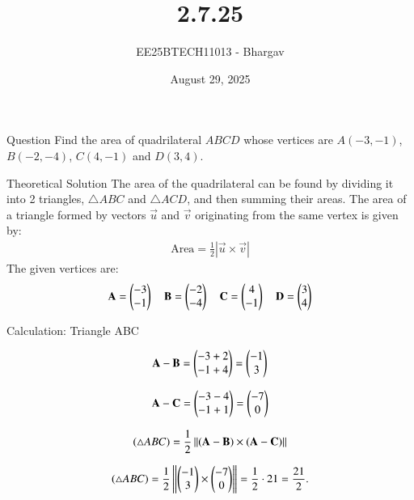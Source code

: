 \documentclass{beamer}
\title{2.7.25}
\author{EE25BTECH11013 - Bhargav}
\date{August 29, 2025}
\begin{document}
\frame{\titlepage}

\begin{frame}{Question}
Find the area of quadrilateral $ABCD$ whose vertices are $A(-3,-1)$, $B(-2,-4)$, $C(4,-1)$ and $D(3,4)$.
\end{frame}

\begin{frame}{Theoretical Solution}
The area of the quadrilateral can be found by dividing it into 2 triangles, $\triangle ABC$ and $\triangle ACD$, and then summing their areas.
\vfill
The area of a triangle formed by vectors $\vec{u}$ and $\vec{v}$ originating from the same vertex is given by:
\begin{align}
    \text{Area} = \frac{1}{2} | \vec{u} \times \vec{v} |
\end{align}
\vfill
The given vertices are:
\begin{align}
    \vec{A} = \myvec{-3 \\ -1} \quad
    \vec{B} = \myvec{-2 \\ -4} \quad
    \vec{C} = \myvec{4 \\ -1} \quad
    \vec{D} = \myvec{3 \\ 4}
\end{align}
\end{frame}

\begin{frame}{Calculation: Triangle ABC}

\begin{align}
\vec{A}-\vec{B} 
= \myvec{-3+2 \\ -1+4} = \myvec{-1 \\ 3}
\end{align}


\begin{align}
\vec{A} - \vec{C} = \myvec{-3-4 \\ -1+1} = \myvec{-7 \\ 0}
\end{align}



\begin{align}
(\triangle ABC)=\frac{1}{2}\norm{(\vec{A}-\vec{B}) \times (\vec{A}-\vec{C})}
\end{align}

\begin{align}
(\triangle ABC)=\frac{1}{2}\norm{\myvec{-1 \\ 3} \times \myvec{-7 \\ 0}}=\frac{1}{2}\cdot 21=\frac{21}{2}.
\end{align}

\end{frame}
\end{document}
